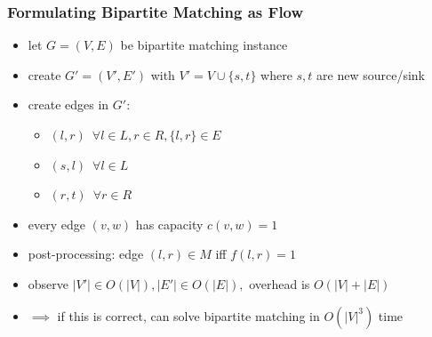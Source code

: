 \documentclass{beamer}
\begin{document}
\begin{frame} \frametitle{Formulating Bipartite Matching as Flow}
\begin{itemize}
  \item let $G=(V, E)$ be bipartite matching instance
  \item create $G'=(V', E')$ with $V' = V \cup \{s, t\}$ where $s, t$ are new
    source/sink
  \item create edges in $G'$:
  \begin{itemize}
    \item $(l, r) \enspace \forall l \in L, r \in R, \{l, r\} \in E$
    \item $(s, l) \enspace \forall l \in L$
    \item $(r, t) \enspace \forall r \in R$
  \end{itemize}
  \item every edge $(v, w)$ has capacity $c(v, w)=1$
  \item post-processing: edge $(l, r) \in M$ iff $f(l, r)=1$
  \item observe $|V'| \in O(|V|), |E'| \in O(|E|),$ overhead is $O(|V|+|E|)$
  \item $\implies$ if this is correct, can solve bipartite matching in $O(|V|^3)$ time
\end{itemize}
\end{frame}
\end{document}
